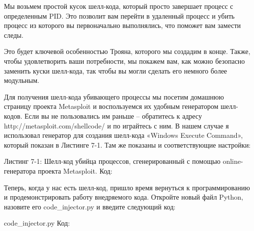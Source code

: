 \documentclass[12pt, a4paper, oneside]{book}
\begin{document}
Мы возьмем простой кусок шелл-кода, который просто завершает процесс с определенным PID. Это позволит вам перейти в удаленный процесс и убить процесс из которого вы первоначально выполнялись, что поможет вам замести следы. 

Это будет ключевой особенностью Трояна, которого мы создадим в конце. Также, чтобы удовлетворить ваши потребности, мы покажем вам, как можно безопасно заменить куски шелл-кода, так чтобы вы могли сделать его немного более модульным.

Для получения шелл-кода убивающего процессы мы посетим домашнюю страницу проекта Metasploit и воспользуемся их удобным генератором шелл-кодов. Если вы не пользовались им раньше – обратитесь к адресу http://metasploit.com/shellcode/ и по играйтесь с ним. В нашем случае я использовал генератор для создания шелл-кода «Windows Execute Command», который показан в Листинге 7-1. Там же показаны и соответствующие настройки:

Листинг 7-1: Шелл-код убийца процессов, сгенерированный с помощью online-генератора проекта Metasploit.
Код:

Теперь, когда у нас есть шелл-код, пришло время вернуться к программированию и продемонстрировать работу внедряемого кода. Откройте новый файл Python, назовите его code\_injector.py и введите следующий код:

code\_injector.py
Код:


\end{document}
